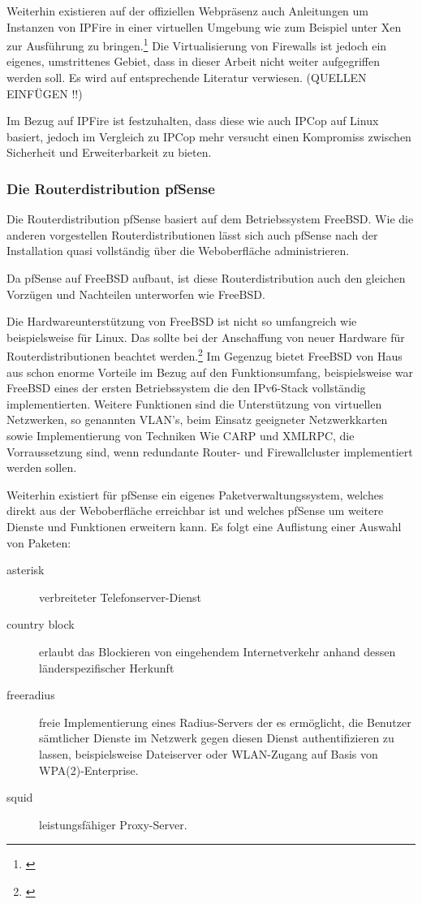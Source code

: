 \documentclass[a4paper,12pt]{scrartcl}
\begin{document}
Weiterhin existieren auf der offiziellen Webpr\"asenz auch Anleitungen um
Instanzen von IPFire in einer virtuellen Umgebung wie zum Beispiel unter Xen
zur Ausf\"uhrung zu bringen.\footnote{\cite{IPFireAddons}} Die Virtualisierung
von Firewalls ist jedoch ein eigenes, umstrittenes Gebiet, dass in dieser
Arbeit nicht weiter aufgegriffen werden soll. Es wird auf entsprechende
Literatur verwiesen. (QUELLEN EINF\"UGEN !!)

Im Bezug auf IPFire ist festzuhalten, dass diese wie auch IPCop auf Linux
basiert, jedoch im Vergleich zu IPCop mehr versucht einen Kompromiss zwischen
Sicherheit und Erweiterbarkeit zu bieten.

\subsubsection{Die Routerdistribution pfSense}
Die Routerdistribution pfSense basiert auf dem Betriebssystem FreeBSD. Wie die
anderen vorgestellen Routerdistributionen l\"asst sich auch pfSense nach der
Installation quasi vollst\"andig \"uber die Weboberfl\"ache administrieren.

Da pfSense auf FreeBSD aufbaut, ist diese Routerdistribution auch den gleichen
Vorz\"ugen und Nachteilen unterworfen wie FreeBSD.

Die Hardwareunterst\"utzung von FreeBSD ist nicht so umfangreich wie
beispielsweise f\"ur Linux. Das sollte bei der Anschaffung von neuer Hardware
f\"ur Routerdistributionen beachtet werden.\footnote{\cite{FreeBSDHardware}} Im
Gegenzug bietet FreeBSD von Haus aus schon enorme Vorteile im Bezug auf den
Funktionsumfang, beispielsweise war FreeBSD eines der ersten Betriebssystem die
den IPv6-Stack vollst\"andig implementierten. Weitere Funktionen sind die
Unterst\"utzung von virtuellen Netzwerken, so genannten VLAN's, beim Einsatz
geeigneter Netzwerkkarten sowie Implementierung von Techniken Wie CARP und XMLRPC,
die Vorraussetzung sind, wenn redundante Router- und Firewallcluster implementiert
werden sollen.

Weiterhin existiert f\"ur pfSense ein eigenes Paketverwaltungssystem, welches
direkt aus der Weboberfl\"ache erreichbar ist und welches pfSense um weitere
Dienste und Funktionen erweitern kann. Es folgt eine Auflistung einer Auswahl
von Paketen:
\begin{description}
 \item[asterisk] verbreiteter Telefonserver-Dienst
 \item[country block] erlaubt das Blockieren von eingehendem Internetverkehr
anhand dessen l\"anderspezifischer Herkunft
 \item[freeradius] freie Implementierung eines Radius-Servers der es
erm\"oglicht, die Benutzer s\"amtlicher Dienste im Netzwerk gegen diesen Dienst
authentifizieren zu lassen, beispielsweise Dateiserver oder WLAN-Zugang auf
Basis von WPA(2)-Enterprise.
 \item[squid] leistungsf\"ahiger Proxy-Server.
\end{description}
\end{document}
